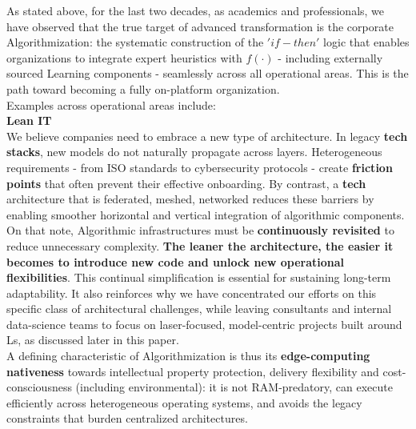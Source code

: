 \documentclass{article}
\begin{document}
As stated above, for the last two decades, as academics and professionals, we have observed that the  true target of advanced transformation is the corporate Algorithmization: the systematic construction of the \begin{math} 'if-then'\end{math} logic that enables organizations to integrate expert heuristics with \begin{math} f(·)\end{math} - including externally sourced Learning components - seamlessly across all operational areas. This is the path toward becoming a fully on-platform organization.\\

Examples across operational areas include:\\

\textbf{Lean IT}\\
We believe companies need to embrace a new type of architecture. In legacy \textbf{tech stacks}, new models do not naturally propagate across layers. Heterogeneous requirements - from ISO standards to cybersecurity protocols - create \textbf{friction points} that often prevent their effective onboarding. By contrast, a \textbf{tech} architecture that is federated, meshed, networked reduces these barriers by enabling smoother horizontal and vertical integration of algorithmic components.\\

On that note, Algorithmic infrastructures must be \textbf{continuously revisited} to reduce unnecessary complexity. \textbf{The leaner the architecture, the easier it becomes to introduce new code and unlock new operational flexibilities}. This continual simplification is essential for sustaining long-term adaptability. It also reinforces why we have concentrated our efforts on this specific class of architectural challenges, while leaving consultants and internal data-science teams to focus on laser-focused, model-centric projects built around Ls, as discussed later in this paper.\\

A defining characteristic of Algorithmization is thus its \textbf{edge-computing nativeness} towards intellectual property protection, delivery flexibility and cost-consciousness (including environmental): it is not RAM-predatory, can execute efficiently across heterogeneous operating systems, and avoids the legacy constraints that burden centralized architectures.\\
\end{document}
